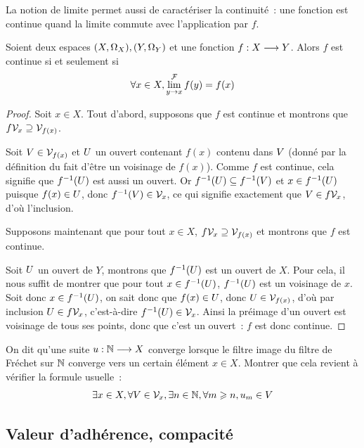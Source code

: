 La notion de limite permet aussi de caractériser la continuité~: une fonction
est continue quand la limite commute avec l'application par $f$.

\begin{property}\label{prop.carac.cont.fil}
  Soient deux espaces $(X,\Omega_{X}), (Y,\Omega_{Y})$ et une fonction
  $f : \displaystyle X \longrightarrow Y$. Alors $f$ est continue si et seulement si
  \[\forall x \in X, \lim^{\mathcal{F}}_{y \to x} f(y) = f(x)\]
\end{property}

\begin{proof}
  Soit $x \in X$. Tout d'abord, supposons que $f$ est continue et montrons que
  $f\mathcal{V}_{x} \supseteq \mathcal{V}_{f(x)}$.

  Soit $V\in\mathcal{V}_{f(x)}$ et $U$ un ouvert contenant $f(x)$ contenu
  dans $V$ (donné par la définition du fait d'être un voisinage de $f(x)$).
  Comme $f$ est continue, cela signifie que $f^{-1}(U)$ est aussi un
  ouvert.
  Or $f^{-1}(U)\subseteq f^{-1}(V)$ et $x\in f^{-1}(U)$ puisque
  $f(x)\in U$, donc $f^{-1}(V)\in\mathcal{V}_{x}$, ce qui signifie
  exactement que $V\in f\mathcal{V}_{x}$, d'où l'inclusion.

  Supposons maintenant que pour tout $x\in X$,
  $f\mathcal{V}_{x}\supseteq \mathcal{V}_{f(x)}$ et montrons que $f$ est continue.

  Soit $U$ un ouvert de $Y$, montrons que $f^{-1}(U)$ est un ouvert de
  $X$. Pour cela, il nous suffit de montrer que pour tout
  $x \in f^{-1}(U)$,
  $f^{-1}(U)$ est un voisinage de $x$. Soit donc $x \in f^{-1}(U)$, on
  sait donc que $f(x) \in U$, donc $U \in \mathcal{V}_{f(x)}$, d'où par
  inclusion $U \in f\mathcal{V}_{x}$, c'est-à-dire
  $f^{-1}(U) \in \mathcal{V}_{x}$. Ainsi la préimage d'un ouvert est voisinage de
  tous ses points, donc que c'est un ouvert~: $f$ est donc continue.
\end{proof}

\begin{exercise}\label{exo.conv.suite}
  On dit qu'une suite $u : \displaystyle \mathbb N \longrightarrow X$ converge lorsque le filtre image
  du filtre de Fréchet sur $\mathbb N$ converge vers un certain élément
  $x\in X$. Montrer que cela revient à vérifier la formule usuelle~:
  \[\exists x\in X,\forall V\in\mathcal{V}_{x}, \exists n \in \mathbb N,
  \forall m \geqslant n, u_m \in V\]
\end{exercise}

\subsection{Valeur d'adhérence, compacité}

